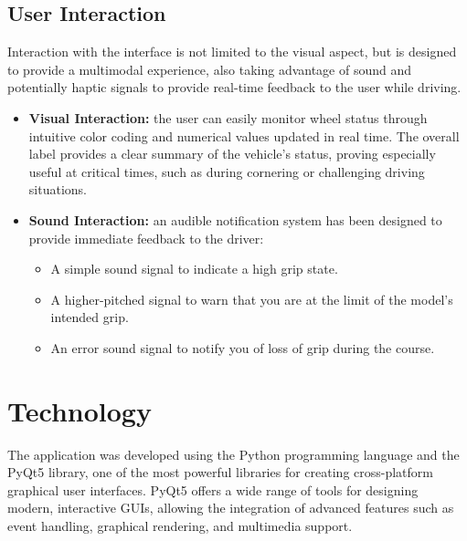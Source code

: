 \documentclass[a4paper,final,12pt]{report}
\begin{document}
\subsection{User Interaction}
Interaction with the interface is not limited to the visual aspect, but is designed to provide a multimodal experience, also taking advantage of sound and potentially haptic signals to provide real-time feedback to the user while driving.

\begin{itemize}
    \item \textbf{Visual Interaction:} the user can easily monitor wheel status through intuitive color coding and numerical values updated in real time. The overall label provides a clear summary of the vehicle's status, proving especially useful at critical times, such as during cornering or challenging driving situations.
    \item \textbf{Sound Interaction:} an audible notification system has been designed to provide immediate feedback to the driver:
    \begin{itemize}
        \item A simple sound signal \cite{bip_sound} to indicate a high grip state.
        \item A higher-pitched signal \cite{bip_sound_machine} to warn that you are at the limit of the model's intended grip.
        \item An error sound signal \cite{beep_warning} to notify you of loss of grip during the course.
    \end{itemize}
\end{itemize}

\section{Technology}
The application was developed using the Python programming language and the PyQt5 library, one of the most powerful libraries for creating cross-platform graphical user interfaces. PyQt5 offers a wide range of tools for designing modern, interactive GUIs, allowing the integration of advanced features such as event handling, graphical rendering, and multimedia support.
\end{document}
